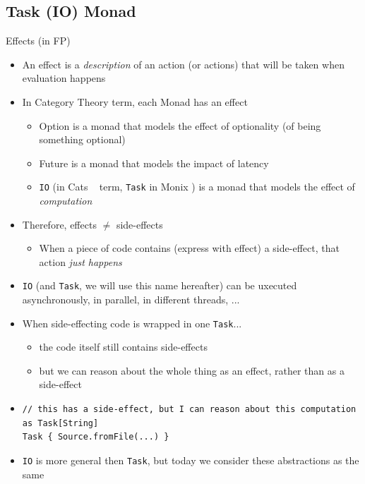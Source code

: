 \documentclass[presentation, 9pt]{beamer}\mode<presentation>{\usetheme{AMSBolognaFC}}
\begin{document}
\subsection{Task (IO) Monad}
\begin{frame}[fragile]{Effects (in FP)}
	\begin{itemize}
		\item An effect is a \emph{description} of an action (or actions) that will be taken when evaluation happens
		\item In Category Theory term, each Monad has an effect
		\begin{itemize}
			\item Option is a monad that models the effect of optionality (of being something optional)
   		\item Future is a monad that models the impact of latency
     	\item \texttt{IO} (in Cats ~\href{https://typelevel.org/cats/}{\faLink} term, \texttt{Task} in Monix \href{https://monix.io/}{\faLink}) is a monad that models the effect of \emph{computation}
		\end{itemize}
		\item Therefore, effects $\neq$ side-effects
		\begin{itemize}
			\item When a piece of code contains (express with effect) a side-effect, that action \emph{just happens}
		\end{itemize}
		\item \texttt{IO} (and \texttt{Task}, we will use this name hereafter) can be uxecuted asynchronously, in parallel, in different threads, ...
  	\item {} When side-effecting code is wrapped in one \texttt{Task}...
		\begin{itemize}
			 \item the code itself still contains side-effects 
			 \item but we can reason about the whole thing as an effect, rather than as a side-effect
    \end{itemize}
		\item[] 	\begin{tcolorbox}[left=0pt, top=0pt, bottom=0pt]
			\begin{verbatim}
// this has a side-effect, but I can reason about this computation as Task[String]
Task { Source.fromFile(...) } 
			\end{verbatim}
		\end{tcolorbox}
		\item {} \texttt{IO} is more general then \texttt{Task}, but today we consider these abstractions as the same
	\end{itemize}
\end{frame}
\end{document}
